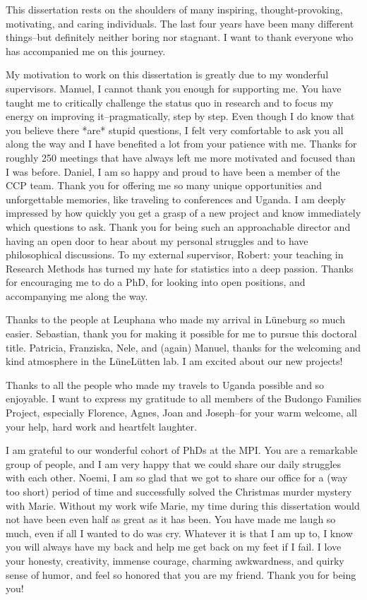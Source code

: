 \documentclass[
]{scrbook}
\begin{document}
\begin{small}

This dissertation rests on the shoulders of many inspiring, thought-provoking, motivating, and caring individuals. The last four years have been many different things\thinspace --\thinspace but definitely neither boring nor stagnant. I want to thank everyone who has accompanied me on this journey.

My motivation to work on this dissertation is greatly due to my wonderful supervisors. Manuel, I cannot thank you enough for supporting me. You have taught me to critically challenge the status quo in research and to focus my energy on improving it\thinspace --\thinspace pragmatically, step by step. Even though I do know that you believe there *are* stupid questions, I felt very comfortable to ask you all along the way and I have benefited a lot from your patience with me. Thanks for roughly 250 meetings that have always left me more motivated and focused than I was before. Daniel, I am so happy and proud to have been a member of the CCP team. Thank you for offering me so many unique opportunities and unforgettable memories, like traveling to conferences and Uganda. I am deeply impressed by how quickly you get a grasp of a new project and know immediately which questions to ask. Thank you for being such an approachable director and having an open door to hear about my personal struggles and to have philosophical discussions. To my external supervisor, Robert: your teaching in Research Methods has turned my hate for statistics into a deep passion. Thanks for encouraging me to do a PhD, for looking into open positions, and accompanying me along the way.

Thanks to the people at Leuphana who made my arrival in Lüneburg so much easier. Sebastian, thank you for making it possible for me to pursue this doctoral title. Patricia, Franziska, Nele, and (again) Manuel, thanks for the welcoming and kind atmosphere in the LüneLütten lab. I am excited about our new projects!

Thanks to all the people who made my travels to Uganda possible and so enjoyable. I want to express my gratitude to all members of the Budongo Families Project, especially Florence, Agnes, Joan and Joseph\thinspace --\thinspace for your warm welcome, all your help, hard work and heartfelt laughter. 

I am grateful to our wonderful cohort of PhDs at the MPI. You are a remarkable group of people, and I am very happy that we could share our daily struggles with each other. Noemi, I am so glad that we got to share our office for a (way too short) period of time and successfully solved the Christmas murder mystery with Marie. Without my work wife Marie, my time during this dissertation would not have been even half as great as it has been. You have made me laugh so much, even if all I wanted to do was cry. Whatever it is that I am up to, I know you will always have my back and help me get back on my feet if I fail. I love your honesty, creativity, immense courage, charming awkwardness, and quirky sense of humor, and feel so honored that you are my friend. Thank you for being you!


\end{small}
\end{document}
